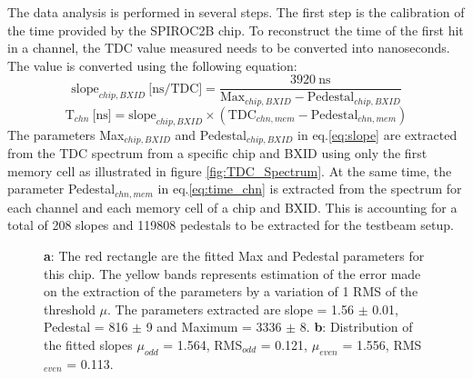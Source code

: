 \documentclass[twoside,a4paper,11pt]{article}
\begin{document}
The data analysis is performed in several steps. The first step is the calibration of the time provided by the SPIROC2B chip. To reconstruct the time of the first hit in a channel, the TDC value measured needs to be converted into nanoseconds. The value is converted using the following equation:
\begin{equation} \label{eq:slope}
 \text{slope}_{chip, BXID} \: \text{[ns/TDC]} = \frac{3920 \: \text{ns}}{\text{Max}_{chip, BXID} - \text{Pedestal}_{chip, BXID}}
\end{equation}
\begin{equation} \label{eq:time_chn}
\text{T}_{chn} \: \text{[ns]} = \text{slope}_{chip, BXID} \times (\text{TDC}_{chn, mem} - \text{Pedestal}_{chn, mem} )
\end{equation}
The parameters Max$_{chip, BXID}$ and Pedestal$_{chip, BXID}$ in eq.\ref{eq:slope} are extracted from the TDC spectrum from a specific chip and BXID using only the first memory cell as illustrated in figure \ref{fig:TDC_Spectrum}. At the same time, the parameter Pedestal$_{chn, mem}$ in eq.\ref{eq:time_chn} is extracted from the spectrum for each channel and each memory cell of a chip and BXID. This is accounting for a total of 208 slopes and 119808 pedestals to be extracted for the testbeam setup.
\begin{figure}[htbp]
	\hfill
	\caption[]{\textbf{a}: The red rectangle are the fitted Max and Pedestal parameters for this chip. The yellow bands represents estimation of the error made on the extraction of the parameters by a variation of 1 RMS of the threshold $\mu$. The parameters extracted are slope = 1.56 $\pm$ 0.01, Pedestal = 816 $\pm$ 9 and Maximum = 3336 $\pm$ 8. \textbf{b}: Distribution of the fitted slopes $\mu_{odd}$ = 1.564, RMS$_{odd}$ = 0.121, $\mu_{even}$ = 1.556, RMS$_{even}$ = 0.113.}
\end{figure}
\end{document}
